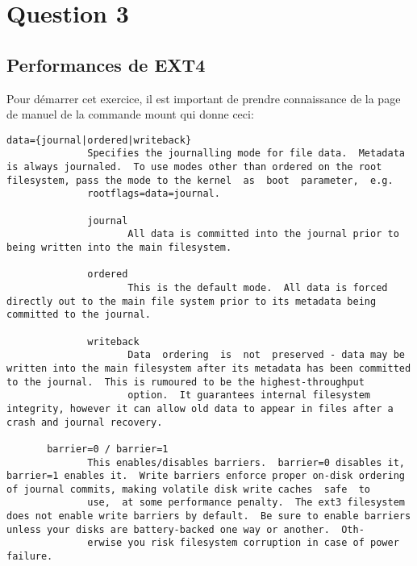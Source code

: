 
\chapter{Question 3} %

\label{Question 3} %


\section{Performances de EXT4}
Pour démarrer cet exercice, il est important de prendre connaissance de la page de manuel de la commande mount qui donne ceci:
\begin{lstlisting}[style=Bash]
data={journal|ordered|writeback}
              Specifies the journalling mode for file data.  Metadata is always journaled.  To use modes other than ordered on the root filesystem, pass the mode to the kernel  as  boot  parameter,  e.g.
              rootflags=data=journal.

              journal
                     All data is committed into the journal prior to being written into the main filesystem.

              ordered
                     This is the default mode.  All data is forced directly out to the main file system prior to its metadata being committed to the journal.

              writeback
                     Data  ordering  is  not  preserved - data may be written into the main filesystem after its metadata has been committed to the journal.  This is rumoured to be the highest-throughput
                     option.  It guarantees internal filesystem integrity, however it can allow old data to appear in files after a crash and journal recovery.

       barrier=0 / barrier=1
              This enables/disables barriers.  barrier=0 disables it, barrier=1 enables it.  Write barriers enforce proper on-disk ordering of journal commits, making volatile disk write caches  safe  to
              use,  at some performance penalty.  The ext3 filesystem does not enable write barriers by default.  Be sure to enable barriers unless your disks are battery-backed one way or another.  Oth‐
              erwise you risk filesystem corruption in case of power failure.
\end{lstlisting}

